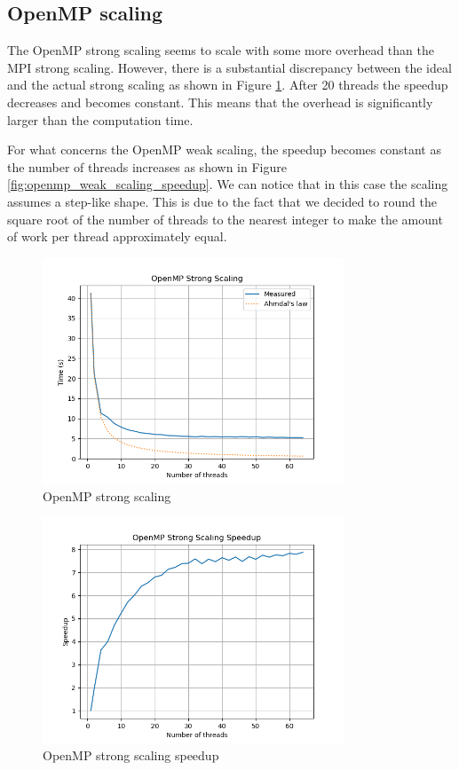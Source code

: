 \subsection{OpenMP scaling}

The OpenMP strong scaling seems to scale with some more overhead than the MPI strong scaling. However, there is a substantial discrepancy between the ideal and the actual strong scaling as shown in Figure \ref{fig:openmp_strong_scaling}. After 20 threads the speedup decreases and becomes constant. This means that the overhead is significantly larger than the computation time.

For what concerns the OpenMP weak scaling, the speedup becomes constant as the number of threads increases as shown in Figure \ref{fig:openmp_weak_scaling_speedup}. We can notice that in this case the scaling assumes a step-like shape. This is due to the fact that we decided to round the square root of the number of threads to the nearest integer to make the amount of work per thread approximately equal.

\begin{figure}[h!]
    \centering
    \includegraphics[width=0.8\textwidth]{../images/omp_strong_scaling.png}
    \caption{OpenMP strong scaling}
    \label{fig:openmp_strong_scaling}
\end{figure}

\begin{figure}[h!]
    \centering
    \includegraphics[width=0.8\textwidth]{../images/omp_strong_scaling_speedup.png}
    \caption{OpenMP strong scaling speedup}
    \label{fig:openmp_strong_scaling_speedup}
\end{figure}

